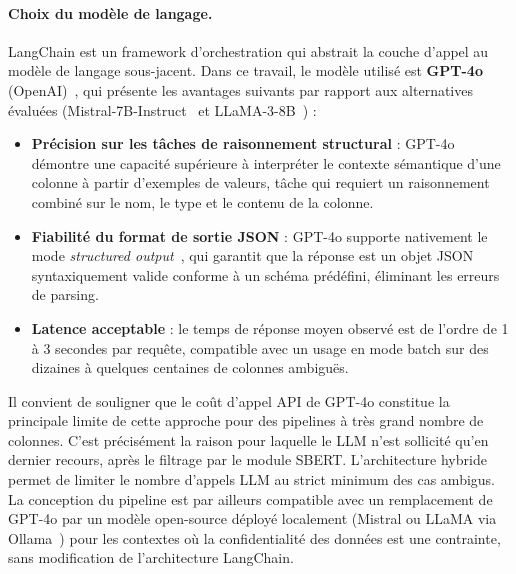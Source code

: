 \paragraph{Choix du modèle de langage.}
LangChain est un framework d'orchestration qui abstrait la couche
d'appel au modèle de langage sous-jacent.
Dans ce travail, le modèle utilisé est \textbf{GPT-4o}
(OpenAI)~\cite{openai2024gpt4}, qui présente les avantages
suivants par rapport aux alternatives évaluées
(Mistral-7B-Instruct~\cite{jiang2023mistral} et
LLaMA-3-8B~\cite{touvron2023llama}) :
\begin{itemize}
    \item \textbf{Précision sur les tâches de raisonnement structural} :
          GPT-4o démontre une capacité supérieure à interpréter le
          contexte sémantique d'une colonne à partir d'exemples de
          valeurs, tâche qui requiert un raisonnement combiné sur le
          nom, le type et le contenu de la colonne.
    \item \textbf{Fiabilité du format de sortie JSON} :
          GPT-4o supporte nativement le mode
          \textit{structured output}~\cite{openai2024gpt4},
          qui garantit que la réponse est un objet JSON
          syntaxiquement valide conforme à un schéma prédéfini,
          éliminant les erreurs de parsing.
    \item \textbf{Latence acceptable} :
          le temps de réponse moyen observé est de l'ordre de
          1 à 3 secondes par requête, compatible avec un usage
          en mode batch sur des dizaines à quelques centaines de
          colonnes ambiguës.
\end{itemize}

Il convient de souligner que le coût d'appel API de GPT-4o constitue
la principale limite de cette approche pour des pipelines à très
grand nombre de colonnes.
C'est précisément la raison pour laquelle le LLM n'est sollicité
qu'en dernier recours, après le filtrage par le module SBERT.
L'architecture hybride permet de limiter le nombre d'appels LLM
au strict minimum des cas ambigus.
La conception du pipeline est par ailleurs compatible avec un
remplacement de GPT-4o par un modèle open-source déployé localement
(Mistral ou LLaMA via Ollama~\cite{ollama2024}) pour les contextes
où la confidentialité des données est une contrainte, sans
modification de l'architecture LangChain.

